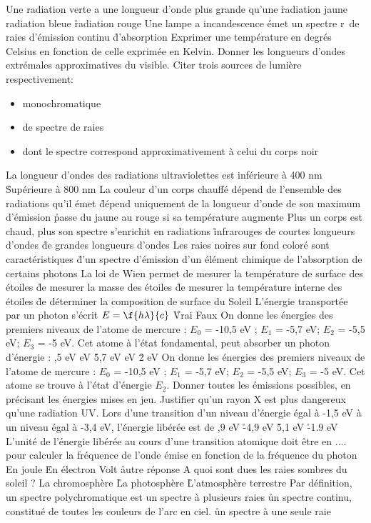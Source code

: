 \q 
Une radiation verte a une longueur d'onde plus grande qu'une 
\r
radiation jaune
\rv 
radiation bleue
\r
radiation rouge
\q 
Une lampe a incandescence émet un spectre 
r\ 
de raies d'émission
\rv 
continu
\r 
d'absorption
\q
Exprimer une température en degrés Celsius en fonction de celle exprimée en Kelvin.
\q
Donner les longueurs d'ondes extrémales approximatives du visible.
\q
Citer trois sources de lumière respectivement:\begin{itemize}\item monochromatique \item de spectre de raies \item dont le spectre correspond approximativement à celui du corps noir \end{itemize}
\q
La longueur d'ondes des radiations ultraviolettes est
\rv
inférieure à 400 nm
\r
Supérieure à 800 nm
\q
La couleur d'un corps chauffé
\rv
dépend de l'ensemble des radiations qu'il émet
\r
dépend uniquement de la longueur d'onde de son maximum d'émission
\r
passe du jaune au rouge si sa température augmente
\q
Plus un corps est chaud, plus son spectre s'enrichit en radiations
\r
infrarouges
\rv
de courtes longueurs d'ondes
\r
de grandes longueurs d'ondes
\q
Les raies noires sur fond coloré sont caractéristiques
\r
d'un spectre d'émission
\rv
d'un élément chimique
\rv
de l'absorption de certains photons
\q
La loi de Wien permet
\rv
de mesurer la température de surface des étoiles
\r
de mesurer la masse des étoiles
\r
de mesurer la température interne des étoiles
\r
de déterminer la composition de surface du Soleil
\q
L'énergie transportée par un photon s'écrit $E=\f{h\lambda}{c}$
\r
Vrai
\rv
Faux
\q
On donne les énergies des premiers niveaux de l'atome de mercure : 
$E_0$ = -10,5 eV ; $E_1$ = -5,7 eV; $E_2$ = -5,5 eV; $E_3$ = -5 eV. Cet atome à l'état fondamental, peut absorber un photon d'énergie :
,5 eV
 eV
\r
5,7 eV
 eV
\r
2 eV
\q
On donne les énergies des premiers niveaux de l'atome de mercure : 
$E_0$ = -10,5 eV ; $E_1$ = -5,7 eV; $E_2$ = -5,5 eV; $E_3$ = -5 eV. Cet atome se trouve à l'état d'énergie $E_2$. Donner toutes les émissions possibles, en précisant les énergies mises en jeu.
\q
Justifier qu'un rayon X est plus dangereux qu'une radiation UV.
\q
Lors d'une transition d'un niveau d'énergie égal à -1,5 eV à un niveau égal à -3,4 eV, l'énergie libérée est de
,9 eV
\r
-4,9 eV
\r
5,1 eV
\r
-1.9 eV
\q
L'unité de l'énergie libérée au cours d'une transition atomique doit être en .... pour calculer la fréquence de l'onde émise en fonction de la fréquence du photon
\rv
En joule
\r
En électron Volt
\r
autre réponse
 \q
A quoi sont dues les raies sombres du soleil ?
\rv
La chromosphère
\r
La photosphère
\r
L'atmosphère terrestre
\q
Par définition, un spectre polychromatique est
\rv
un spectre à plusieurs raies
\r
un spectre continu, constitué de toutes les couleurs de l'arc en ciel.
\r
un spectre à une seule raie
